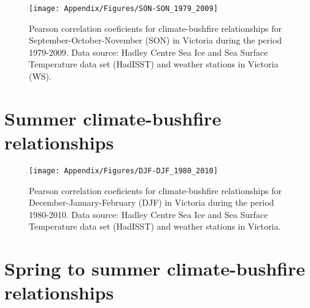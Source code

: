 \begin{figure}[H]
\begin{centering}
\texttt{[image: Appendix/Figures/SON-SON\_1979\_2009]}
\par\end{centering}

\caption[Pearson correlation coeficients for climate-bushfire relationships
for September-October-November (SON) in Victoria during the period
1979-2009]{Pearson correlation coeficients for climate-bushfire relationships
for September-October-November (SON) in Victoria during the period
1979-2009. Data source: Hadley Centre Sea Ice and Sea Surface Temperature
data set (HadISST) and weather stations in Victoria (WS). \label{fig:Pearson correlation coeficients for climate-bushfire relationships for September-October-November (SON) in Victoria during the period 1979-2009}}


\end{figure}



\section{Summer climate-bushfire relationships}

\begin{figure}[H]
\begin{centering}
\texttt{[image: Appendix/Figures/DJF-DJF\_1980\_2010]}
\par\end{centering}

\caption[Pearson correlation coeficients for climate-bushfire relationships
for December-January-February (DJF) in Victoria during the period
1980-2010]{Pearson correlation coeficients for climate-bushfire relationships
for December-January-February (DJF) in Victoria during the period
1980-2010. Data source: Hadley Centre Sea Ice and Sea Surface Temperature
data set (HadISST) and weather stations in Victoria. \label{fig:Pearson correlation coeficients for climate-bushfire relationships for December-January-February (DJF) in Victoria during the period 1980-2010}}


\end{figure}



\section{Spring to summer climate-bushfire relationships}

